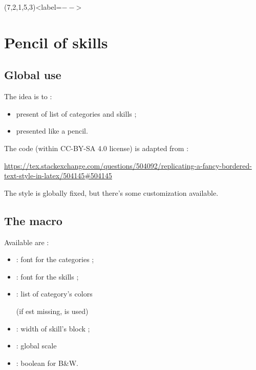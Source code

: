 \documentclass[english,11pt,a4paper]{article}
\begin{document}
(7,2,1,5,3)<label=$--$>

\pagebreak

\section{Pencil of skills}

\subsection{Global use}

The idea is to :

\begin{itemize}
	\item present of list of categories and skills ;
	\item presented like a pencil.
\end{itemize}

The code (within CC-BY-SA 4.0 license) is adapted from :

\hfill{\footnotesize \url{https://tex.stackexchange.com/questions/504092/replicating-a-fancy-bordered-text-style-in-latex/504145#504145}}\hfill~

\begin{codehigh}[language=latex/latex3,style/main=teal!25,style/code=teal!25]
\end{codehigh}

The style is globally fixed, but there's some customization available.

\subsection{The macro}

Available  are :

\begin{itemize}
	\item {} : font for the categories ;
	\item {} : font for the skills ;
	\item {} : list of category's colors
	
	
	(if  est missing,  is used)
	\item {} : width of skill's block ;
	\item {} : global scale
	\item {} : boolean for B\&W.
\end{itemize}
\end{document}
